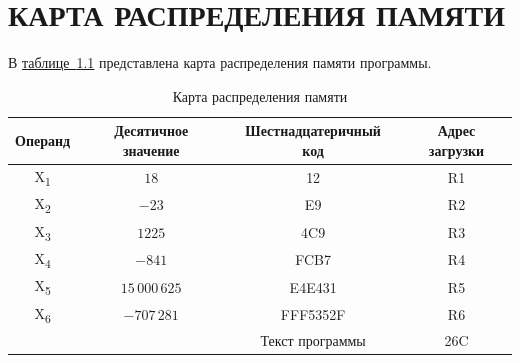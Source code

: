 \chapter{КАРТА РАСПРЕДЕЛЕНИЯ ПАМЯТИ}

В \hyperref[tab:memory_map]{таблице~\ref*{tab:memory_map}} представлена карта распределения памяти программы.
\begin{table}[!ht]
\centering
\caption{Карта распределения памяти}
\label{tab:memory_map}
\begin{tabular}{|c|c|c|c|}
\hline
Операнд & Десятичное значение & Шестнадцатеричный код & Адрес загрузки \\
\hline
X\textsubscript{1} & $18$ & 12 & R1 \\
\hline
X\textsubscript{2} & $-23$ & E9 & R2 \\
\hline
X\textsubscript{3} & $1225$ & 4C9 & R3 \\
\hline
X\textsubscript{4} & $-841$ & FCB7 & R4 \\
\hline
X\textsubscript{5} & $15\,000\,625$ & E4E431 & R5 \\
\hline
X\textsubscript{6} & $-707\,281$ & FFF5352F & R6 \\
\hline
~ & ~ & Текст программы & 26C \\
\hline
\end{tabular}
\end{table}